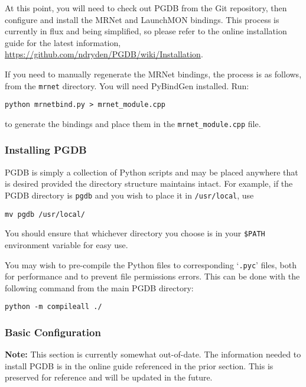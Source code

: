 \documentclass{refart}
\begin{document}
At this point, you will need to check out PGDB from the Git repository, then configure and install the MRNet and LaunchMON bindings. This process is currently in flux and being simplified, so please refer to the online installation guide for the latest information, \url{https://github.com/ndryden/PGDB/wiki/Installation}.

If you need to manually regenerate the MRNet bindings, the process is as follows, from the \texttt{mrnet} directory. You will need PyBindGen installed. Run:

\begin{Verbatim}
python mrnetbind.py > mrnet_module.cpp
\end{Verbatim}

to generate the bindings and place them in the \texttt{mrnet\_module.cpp} file.

\subsubsection{Installing PGDB}

PGDB is simply a collection of Python scripts and may be placed anywhere that is desired provided the directory structure maintains intact. For example, if the PGDB directory is \texttt{pgdb} and you wish to place it in \texttt{/usr/local}, use

\begin{Verbatim}
mv pgdb /usr/local/
\end{Verbatim}

You should ensure that whichever directory you choose is in your \texttt{\$PATH} environment variable for easy use.

You may wish to pre-compile the Python files to corresponding `\texttt{.pyc}' files, both for performance and to prevent file permissions errors. This can be done with the following command from the main PGDB directory:
\begin{Verbatim}
python -m compileall ./
\end{Verbatim}

\subsubsection{Basic Configuration}

\textbf{Note:} This section is currently somewhat out-of-date. The information needed to install PGDB is in the online guide referenced in the prior section. This is preserved for reference and will be updated in the future.
\end{document}
